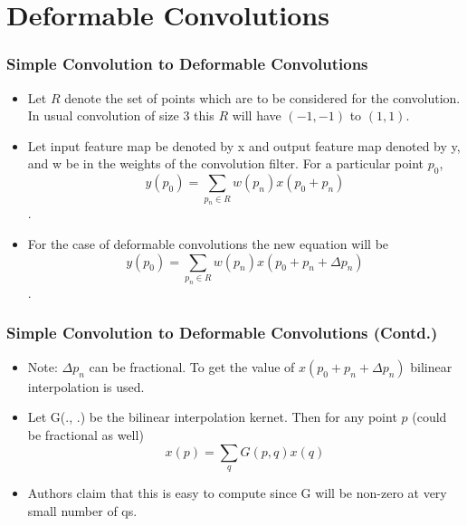 \documentclass{beamer}
\begin{document}
\section{Deformable Convolutions} %
\begin{frame}
  \frametitle{Simple Convolution to Deformable Convolutions}
  \begin{itemize}
  \item Let $R$ denote the set of points which are to be considered for the convolution. In usual convolution of size 3 this $R$ will have $(-1,-1)$ to $(1, 1)$.
  \item Let input feature map be denoted by x and output feature map denoted by y, and w be in the weights of the convolution filter. For a particular point $p_0$, $$y(p_0) = \sum_{p_n \in R}w(p_n) x(p_0 + p_n)$$.
  \item For the case of deformable convolutions the new equation will be
    $$y(p_0) = \sum_{p_n \in R}w(p_n) x(p_0 + p_n + \Delta p_n)$$.
  \end{itemize}
\end{frame}

\begin{frame}
  \frametitle{Simple Convolution to Deformable Convolutions (Contd.)}
  \begin{itemize}
  \item Note: $\Delta p_n$ can be fractional. To get the value of $x(p_0 + p_n + \Delta p_n)$ bilinear interpolation is used.
  \item Let G(., .) be the bilinear interpolation kernet. Then for any point $p$ (could be fractional as well) $$x(p) = \sum_{q}G(p,q) x(q)$$
  \item Authors claim that this is easy to compute since G will be non-zero at very small number of qs.
  \end{itemize}
\end{frame}

\end{document}
